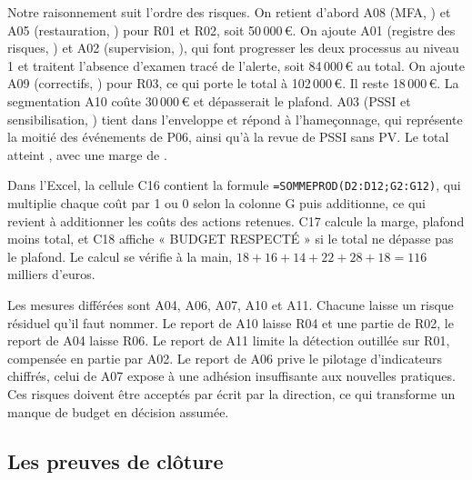 \documentclass[11pt,a4paper]{article}
\begin{document}
Notre raisonnement suit l'ordre des risques. On retient d'abord A08 (MFA, ) et A05 (restauration, ) pour R01 et R02, soit 50\,000\,€. On ajoute A01 (registre des risques, ) et A02 (supervision, ), qui font progresser les deux processus au niveau 1 et traitent l'absence d'examen tracé de l'alerte, soit 84\,000\,€ au total. On ajoute A09 (correctifs, ) pour R03, ce qui porte le total à 102\,000\,€. Il reste 18\,000\,€. La segmentation A10 coûte 30\,000\,€ et dépasserait le plafond. A03 (PSSI et sensibilisation, ) tient dans l'enveloppe et répond à l'hameçonnage, qui représente la moitié des événements de P06, ainsi qu'à la revue de PSSI sans PV. Le total atteint \TotalRetenu, avec une marge de \Marge.

Dans l'Excel, la cellule C16 contient la formule \texttt{=SOMMEPROD(D2:D12;G2:G12)}, qui multiplie chaque coût par 1 ou 0 selon la colonne G puis additionne, ce qui revient à additionner les coûts des actions retenues. C17 calcule la marge, plafond moins total, et C18 affiche « BUDGET RESPECTÉ » si le total ne dépasse pas le plafond. Le calcul se vérifie à la main, $18 + 16 + 14 + 22 + 28 + 18 = 116$ milliers d'euros.


Les mesures différées sont A04, A06, A07, A10 et A11. Chacune laisse un risque résiduel qu'il faut nommer. Le report de A10 laisse R04 et une partie de R02, le report de A04 laisse R06. Le report de A11 limite la détection outillée sur R01, compensée en partie par A02. Le report de A06 prive le pilotage d'indicateurs chiffrés, celui de A07 expose à une adhésion insuffisante aux nouvelles pratiques. Ces risques doivent être acceptés par écrit par la direction, ce qui transforme un manque de budget en décision assumée.

\subsection{Les preuves de clôture}
\end{document}

